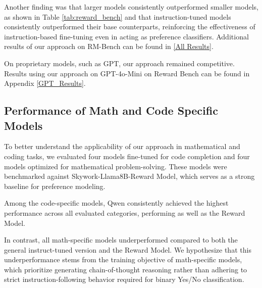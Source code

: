 Another finding was that larger models consistently outperformed smaller models, as shown in Table \ref{tab:reward_bench} and that instruction-tuned models consistently outperformed their base counterparts, reinforcing the effectiveness of instruction-based fine-tuning even in acting as preference classifiers. Additional results of our approach on RM-Bench can be found in \ref{All Results}.

On proprietary models, such as GPT, our approach remained competitive. Results using our approach on GPT-4o-Mini on Reward Bench can be found in Appendix \ref{GPT_Results}. 

\subsection{Performance of Math and Code Specific Models}

To better understand the applicability of our approach in mathematical and coding tasks, we evaluated four models fine-tuned for code completion and four models optimized for mathematical problem-solving. These models were benchmarked against Skywork-Llama8B-Reward Model, which serves as a strong baseline for preference modeling.

Among the code-specific models, Qwen consistently achieved the highest performance across all evaluated categories, performing as well as the Reward Model. 

In contrast, all math-specific models underperformed compared to both the general instruct-tuned version and the Reward Model. We hypothesize that this underperformance stems from the training objective of math-specific models, which prioritize generating chain-of-thought reasoning \citep{yang2024qwen2,shao2024deepseekmathpushinglimitsmathematical,gao2024designing,zhou2024dual} rather than adhering to strict instruction-following behavior required for binary Yes/No classification.
